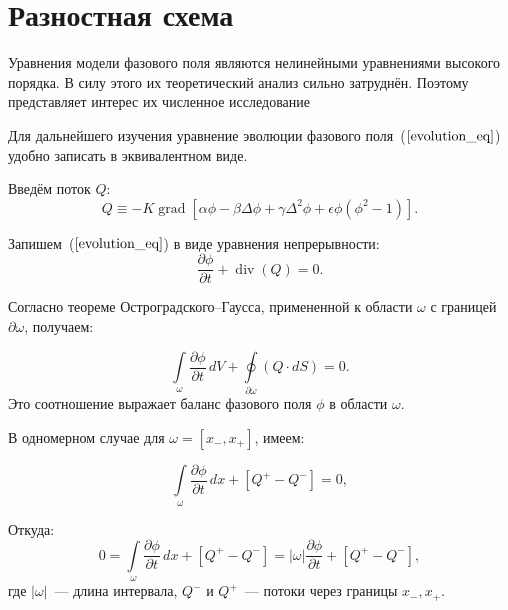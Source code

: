 %
%

\section{Разностная схема}


Уравнения модели фазового поля являются нелинейными уравнениями высокого порядка. В силу этого их теоретический анализ сильно затруднён. Поэтому представляет интерес их численное исследование \cite{elsey_2012, moats_2018, zhuang_2021}


Для дальнейшего изучения уравнение эволюции фазового поля~($\ref{evolution_eq}$) удобно записать в эквивалентном виде.

Введём поток \(Q\):
\begin{equation*}
    Q \equiv - K \operatorname{grad}\left[\alpha \phi - \beta \Delta \phi + \gamma \Delta^2 \phi +
    \epsilon \phi (\phi^2 - 1)\right].
\end{equation*}

Запишем~($\ref{evolution_eq}$) в виде уравнения непрерывности:
\begin{equation} \label{neprerivn}
    \frac{\partial \phi}{\partial t} + \operatorname{div} (Q) = 0.
\end{equation}

Согласно теореме Остроградского–Гаусса, примененной к области $\omega$ с границей $\partial \omega$, получаем:

\begin{equation*}
    \int \limits_{\omega}  \frac{\partial \phi}{\partial t} \, d V + 
    \oint \limits_{\partial \omega} (Q \cdot dS) = 0.
\end{equation*}
Это соотношение выражает баланс фазового поля $\phi$ в области $\omega$.

В одномерном случае для $\omega = [x_-, x_+]$, имеем:

\begin{equation*}
    \int \limits_{\omega}  \frac{\partial \phi}{\partial t} \, d x + 
    \left [ Q^{+} - Q^{-} \right ] = 0,
\end{equation*}

Откуда:
\begin{equation*}
    0 = \int \limits_{\omega}  \frac{\partial \phi}{\partial t} \, d x + \left [ Q^{+} - Q^{-} \right ] =  | \omega |  \frac{\partial \phi}{\partial t} + \left[ Q^{+} - Q^{-} \right],
\end{equation*}
где $|\omega|$~--- длина интервала, $Q^{-}$ и $Q^{+}$~--- потоки через границы $x_-, x_+$.

